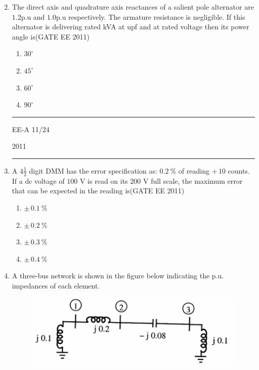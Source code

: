 \documentclass[a4paper,10pt]{exam}
\theoremstyle{remark}
\begin{document}
\begin{enumerate}
\begin{multicols}{2}
\begin{enumerate}
\end{enumerate}
\end{multicols}



\item \quad The direct axis and quadrature axis reactances of a salient pole alternator are $1.2$p.u and $1.0$p.u respectively. The armature resistance is negligible. If this alternator is delivering rated kVA at upf and at rated voltage then its power angle is\hfill{(GATE EE 2011)}

\begin{multicols}{4}
\begin{enumerate}
\item $30^\circ$
\item $45^\circ$
\item $60^\circ$
\item $90^\circ$
\end{enumerate}
\end{multicols}
\vfill
\noindent\rule{\textwidth}{0.4pt}
\raggedright{EE-A}
\hfill
11/24
\newpage
\raggedright{2011}
\hfill
{}\\

\noindent\rule{\textwidth}{0.4pt}

\item \quad A $4\frac{1}{2}$ digit DMM has the error specification as: $0.2~\%$ of reading $+\,10$ counts. If a dc voltage of $100$ V is read on its $200$ V full scale, the maximum error that can be expected in the reading is\hfill{(GATE EE 2011)}
\begin{multicols}{4}
\begin{enumerate}

\item $\pm\,0.1~\%$
\item $\pm\,0.2~\%$
\item $\pm\,0.3~\%$
\item $\pm\,0.4~\%$

\end{enumerate}
\end{multicols}

\item \quad A three-bus network is shown in the figure below indicating the p.u. impedances of each element.
\begin{figure}[H]
    \centering
    \includegraphics[width=0.7\columnwidth]{figs/Q 44.png}\caption{}     \label{fig:myfigure}
\end{figure}



\end{enumerate}
\end{document}
